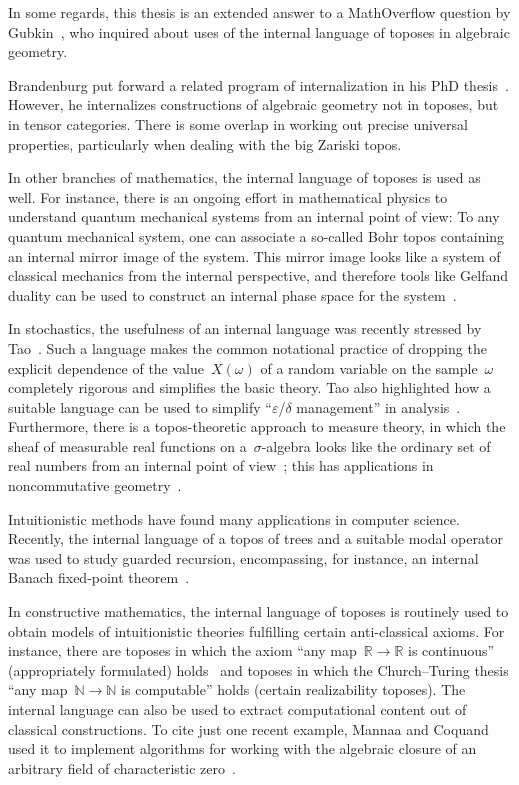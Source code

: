 \documentclass[10pt,reqno,a4paper]{amsbook}
\theoremstyle{definition}
\theoremstyle{plain}
\theoremstyle{remark}
\newcommand{\NN}{\mathbb{N}}
\newcommand{\RR}{\mathbb{R}}
\newcommand{\?}{\,{:}\,}
\renewcommand{\_}{\mathpunct{.}\,}
\begin{document}
{In some regards, this thesis is an extended answer to a MathOverflow question
by Gubkin~\cite{mo:gubkin}, who inquired about uses of the internal language of
toposes in algebraic geometry.

Brandenburg put forward a related program of internalization in his PhD
thesis~\cite{brandenburg:tensor-foundations}. However, he internalizes
constructions of algebraic geometry not in toposes, but in tensor categories.
There is some overlap in working out precise universal properties, particularly
when dealing with the big Zariski topos.

In other branches of mathematics, the internal language of toposes is used as well. For
instance, there is an ongoing effort in mathematical physics to understand
quantum mechanical systems from an internal point of view: To any quantum
mechanical system, one can associate a so-called Bohr topos containing an
internal mirror image of the system. This mirror image looks like a
system of classical mechanics from the internal perspective, and therefore
tools like Gelfand duality can be used to construct an internal
phase space for the system~\cite{bohr1,bohr2,bohr3}.

In stochastics, the usefulness of an internal language was recently stressed by
Tao~\cite{tao:analysis-rel-measure-space}. Such a language makes the
common notational practice of dropping the explicit dependence of the
value~$X(\omega)$ of a random variable on the sample~$\omega$ completely
rigorous and simplifies the basic theory. Tao also highlighted how a suitable
language can be used to simplify ``$\varepsilon$/$\delta$ management'' in
analysis~\cite{tao:cheap-nsa}. Furthermore, there is a topos-theoretic approach to
measure theory, in which the sheaf of measurable real functions on
a~$\sigma$-algebra looks like the ordinary set of real numbers from an internal point
of view~\cite{jackson:sheaf-theoretic-measure-theory}; this has applications in
noncommutative geometry~\cite{henry:measure-theory-boolean-toposes}.

Intuitionistic methods have found many applications in computer science.
Recently, the internal language of a topos of trees and a suitable modal
operator was used to study guarded recursion, encompassing, for instance, an
internal Banach fixed-point theorem~\cite{birkedal:al:sgdt}.

In constructive mathematics, the internal language of toposes is routinely used
to obtain models of intuitionistic theories fulfilling certain anti-classical
axioms. For instance, there are toposes in which the axiom ``any map~$\RR \to
\RR$ is continuous'' (appropriately formulated) holds~\cite{kock:sdg,moerdijk:reyes:models}
and toposes in which the Church--Turing thesis ``any map~$\NN \to \NN$ is
computable'' holds (certain realizability toposes).
The internal language can also be used to extract computational content
out of classical constructions. To cite just one recent example, Mannaa and
Coquand used it to implement algorithms for working with the algebraic closure
of an arbitrary field of characteristic zero~\cite{mannaa:coquand:alg-closure}.

}
\end{document}
